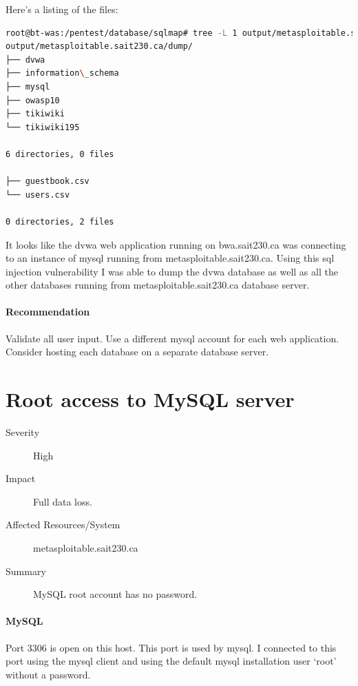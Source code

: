 \documentclass{article}
\begin{document}
Here's a listing of the files:

\begin{lstlisting}[language=Bash]
root@bt-was:/pentest/database/sqlmap# tree -L 1 output/metasploitable.sait230.ca/dump/ | less
output/metasploitable.sait230.ca/dump/
├── dvwa
├── information\_schema
├── mysql
├── owasp10
├── tikiwiki
└── tikiwiki195

6 directories, 0 files

├── guestbook.csv
└── users.csv

0 directories, 2 files

\end{lstlisting}

It looks like the dvwa web application running on bwa.sait230.ca was connecting to an
instance of mysql running from metasploitable.sait230.ca. Using this sql injection vulnerability
I was able to dump the dvwa database as well as all the other databases
running from metasploitable.sait230.ca database server.

\paragraph{Recommendation}

Validate all user input. Use a different mysql account for each web application.
Consider hosting each database on a separate database server.

\newpage
\section{Root access to MySQL server}

\begin{description}
  \item[Severity] High
  \item[Impact] Full data loss.
  \item[Affected Resources/System] metasploitable.sait230.ca
  \item[Summary] MySQL root account has no password.
\end{description}

\paragraph{MySQL}
Port 3306 is open on this host. This port
is used by mysql. I connected to this port using the mysql client and
using the default mysql installation user `root' without a password.
\end{document}
